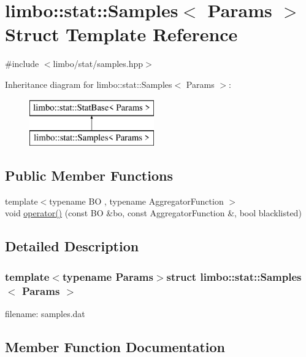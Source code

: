 \hypertarget{structlimbo_1_1stat_1_1_samples}{}\section{limbo\+:\+:stat\+:\+:Samples$<$ Params $>$ Struct Template Reference}
\label{structlimbo_1_1stat_1_1_samples}


{\ttfamily \#include $<$limbo/stat/samples.\+hpp$>$}

Inheritance diagram for limbo\+:\+:stat\+:\+:Samples$<$ Params $>$\+:\begin{figure}[H]
\begin{center}
\leavevmode
\includegraphics[height=2.000000cm]{structlimbo_1_1stat_1_1_samples}
\end{center}
\end{figure}
\subsection*{Public Member Functions}
\begin{DoxyCompactItemize}
\item 
{\footnotesize template$<$typename B\+O , typename Aggregator\+Function $>$ }\\void \hyperlink{structlimbo_1_1stat_1_1_samples_ad93fe002d60296abbd96f569dc1030ac}{operator()} (const B\+O \&bo, const Aggregator\+Function \&, bool blacklisted)
\end{DoxyCompactItemize}


\subsection{Detailed Description}
\subsubsection*{template$<$typename Params$>$struct limbo\+::stat\+::\+Samples$<$ Params $>$}

filename\+: {\ttfamily samples.\+dat} 

\subsection{Member Function Documentation}
\hypertarget{structlimbo_1_1stat_1_1_samples_ad93fe002d60296abbd96f569dc1030ac}{}
